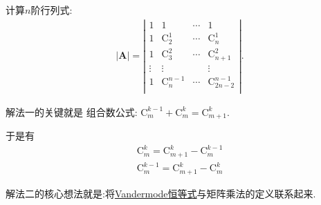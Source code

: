 \documentclass[../../main.tex]{subfiles}
\begin{document}
\begin{example}
计算$n$阶行列式:
\begin{align*}
|\boldsymbol{A}|=\left| \begin{matrix}
1&		1&		\cdots&		1\\
1&		\mathrm{C}_{2}^{1}&		\cdots&		\mathrm{C}_{n}^{1}\\
1&		\mathrm{C}_{3}^{2}&		\cdots&		\mathrm{C}_{n+1}^{2}\\
\vdots&		\vdots&		&		\vdots\\
1&		\mathrm{C}_{n}^{n-1}&		\cdots&		\mathrm{C}_{2n-2}^{n-1}\\
\end{matrix} \right|.
\end{align*}
\end{example}
\begin{note}
{\color{blue}解法一}的关键就是
组合数公式:
$\mathrm{C}_{m}^{k-1}+\mathrm{C}_{m}^{k}=\mathrm{C}_{m+1}^{k}$.

于是有
\begin{gather*}
\mathrm{C}_{m}^{k}=\mathrm{C}_{m+1}^{k}-\mathrm{C}_{m}^{k-1}
\\
\mathrm{C}_{m}^{k-1}=\mathrm{C}_{m+1}^{k}-\mathrm{C}_{m}^{k}
\end{gather*}

{\color{blue}解法二}的核心想法就是:将\hyperref[theorem:Vandermode恒等式]{Vandermode恒等式}与矩阵乘法的定义联系起来.
\end{note}
\end{document}
